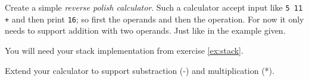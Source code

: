 \begin{Exercise}[title={Calculator},difficulty=7]
\label{ex:calc}
\Question \label{ex:calc q1} Create a simple \emph{reverse polish calculator}. Such a calculator
accept input like \texttt{5 11 +} and then print \texttt{16}; so first the operands and then the
operation. For now it only needs to support addition with two operands. Just like in the
example given.

You will need your stack implementation from exercise \ref{ex:stack}.

\Question \label{ex:calc q2} Extend your calculator to support substraction (-) and multiplication (*).
\end{Exercise}

\begin{Answer}

\Question

\Question

\end{Answer}

